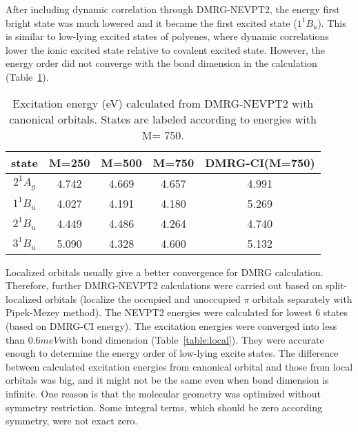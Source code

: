 After including dynamic correlation through DMRG-NEVPT2, the energy first bright state was much lowered and it became the first excited state ($1^1B_u$). 
This is similar to low-lying excited states of polyenes, where dynamic correlations lower the ionic excited state relative to covalent excited state.
However, the energy order did not converge with the bond dimension in the calculation (Table~\ref{table:canonical}).


\begin{table}
   \caption{Excitation energy (eV) calculated from DMRG-NEVPT2 with canonical orbitals. States are labeled according to energies with M= 750. }
  \label{table:canonical}
\begin{tabular}{ccccc}
\hline
  state & M=250 & M=500 & M=750 & DMRG-CI(M=750)\\
\hline
  $2^1A_g$ & 4.742 &  4.669  &   4.657   &   4.991 \\
  $1^1B_u$ & 4.027 &  4.191  &   4.180   &   5.269 \\
  $2^1B_u$ & 4.449 &  4.486  &   4.264   &   4.740 \\
  $3^1B_u$ & 5.090 &  4.328  &   4.600   &   5.132 \\
\hline
\end{tabular}
\end{table}

Localized orbitals usually give a better convergence for DMRG calculation.\cite{olivares-amaya_ab-initio_2015} Therefore, further DMRG-NEVPT2 calculations were carried out based on split-localized orbitals (localize the occupied and unoccupied $\pi$ orbitals separately with Pipek-Mezey method\cite{pipek_fast_1989}). 
The NEVPT2 energies were calculated for lowest 6 states (based on DMRG-CI energy). The excitation energies were converged into less than $0.6 meV$with bond dimension (Table~\ref{table:local}). They were accurate enough to determine the energy order of low-lying excite states. 
The difference between calculated excitation energies from canonical orbital and those from local orbitals was big, and it might not be the same even when bond dimension is infinite. One reason is that the molecular geometry was optimized without symmetry restriction. Some integral terms, which should be zero according symmetry, were not exact zero. 

